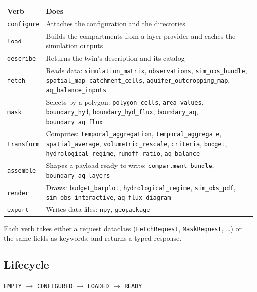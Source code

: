 \begin{center}
\begin{tabular}{p{} p{}}
\textbf{Verb} & \textbf{Does} \\
\hline
\texttt{configure} & Attaches the configuration and the directories \\
\texttt{load} & Builds the compartments from a layer provider and caches the simulation outputs \\
\texttt{describe} & Returns the twin's description and its catalog \\
\texttt{fetch} & Reads data: \texttt{simulation\_matrix}, \texttt{observations}, \texttt{sim\_obs\_bundle}, \texttt{spatial\_map}, \texttt{catchment\_cells}, \texttt{aquifer\_outcropping\_map}, \texttt{aq\_balance\_inputs} \\
\texttt{mask} & Selects by a polygon: \texttt{polygon\_cells}, \texttt{area\_values}, \texttt{boundary\_hyd}, \texttt{boundary\_hyd\_flux}, \texttt{boundary\_aq}, \texttt{boundary\_aq\_flux} \\
\texttt{transform} & Computes: \texttt{temporal\_aggregation}, \texttt{temporal\_aggregate}, \texttt{spatial\_average}, \texttt{volumetric\_rescale}, \texttt{criteria}, \texttt{budget}, \texttt{hydrological\_regime}, \texttt{runoff\_ratio}, \texttt{aq\_balance} \\
\texttt{assemble} & Shapes a payload ready to write: \texttt{compartment\_bundle}, \texttt{boundary\_aq\_layers} \\
\texttt{render} & Draws: \texttt{budget\_barplot}, \texttt{hydrological\_regime}, \texttt{sim\_obs\_pdf}, \texttt{sim\_obs\_interactive}, \texttt{aq\_flux\_diagram} \\
\texttt{export} & Writes data files: \texttt{npy}, \texttt{geopackage} \\
\end{tabular}
\end{center}

Each verb takes either a request dataclass (\texttt{FetchRequest},
\texttt{MaskRequest}, \ldots) or the same fields as keywords, and returns a
typed response.

\subsection{Lifecycle}

\begin{center}
\texttt{EMPTY} $\rightarrow$ \texttt{CONFIGURED} $\rightarrow$ \texttt{LOADED} $\rightarrow$ \texttt{READY}
\end{center}

